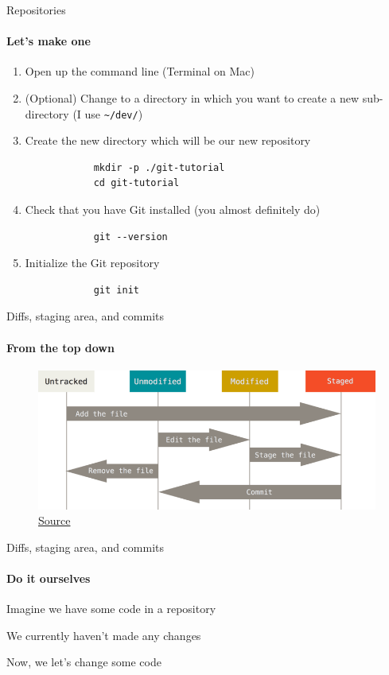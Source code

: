 \documentclass[pdf]{beamer} %
\begin{document}
\begin{frame}[fragile]{Repositories}
    \framesubtitle{Let's make one}
    \begin{enumerate}
        \item Open up the command line (Terminal on Mac)
        \item (Optional) Change to a directory in which you want to create a new sub-directory (I use \texttt{\textasciitilde/dev/})
        \item Create the new directory which will be our new repository
        \begin{verbatim}
            mkdir -p ./git-tutorial
            cd git-tutorial
        \end{verbatim}
    \item Check that you have Git installed (you almost definitely do)
        \begin{verbatim}
            git --version
        \end{verbatim}
    \item Initialize the Git repository
        \begin{verbatim}
            git init
        \end{verbatim}
    \end{enumerate}
\end{frame}

\begin{frame}{Diffs, staging area, and commits}
    \framesubtitle{From the top down}
    \bigskip
    \begin{figure}[htpb]
        \centering
        \includegraphics[width=.8\linewidth]{fig/staging-area-lifecycle.png}
        \caption{\href{https://git-scm.com/book/en/v2/Git-Basics-Recording-Changes-to-the-Repository}{Source}}
        \label{fig:staging-area}
    \end{figure}
\end{frame}

\begin{frame}{Diffs, staging area, and commits}
    \framesubtitle{Do it ourselves}
    Imagine we have some code in a repository

    \bigskip
    We currently haven't made any changes

    \bigskip
    Now, we let's change some code
\end{frame}
\end{document}
